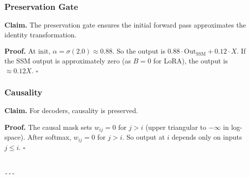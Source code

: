 \subsubsection{Preservation Gate}

\textbf{Claim.} The preservation gate ensures the initial forward pass approximates 
the identity transformation.

\textbf{Proof.} At init, $\alpha = \sigma(2.0) \approx 0.88$. So the output is 
$0.88 \cdot \text{Out}_\text{SSM} + 0.12 \cdot X$. If the SSM output is 
approximately zero (as $B = 0$ for LoRA), the output is $\approx 0.12 X$. 
$\square$

\subsubsection{Causality}

\textbf{Claim.} For decoders, causality is preserved.

\textbf{Proof.} The causal mask sets $w_{ij} = 0$ for $j > i$ (upper triangular 
to $-\infty$ in log-space). After softmax, $w_{ij} = 0$ for $j > i$. So 
output at $i$ depends only on inputs $j \leq i$. $\square$
\begin{lstlisting}

---
\end{lstlisting}